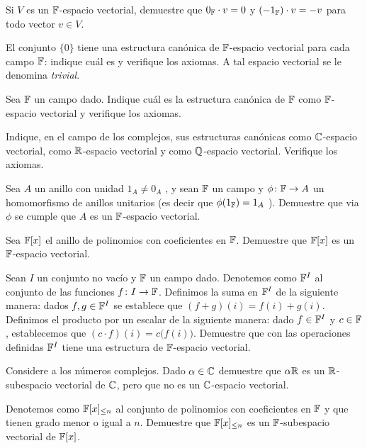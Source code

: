 \ExerciseSection


\begin{exerciselist}
  \item Si $V$ es un $\mathbb{F}$-espacio vectorial, demuestre que $0_{\mathbb{F}} \cdot v = 0$ y $(-1_{\mathbb{F}}) \cdot v = -v$ para todo vector $v \in V$.

  \item El conjunto $\{0\}$ tiene una estructura canónica de $\mathbb{F}$-espacio vectorial para cada campo $\mathbb{F}$: indique cuál es y verifique los axiomas. A tal espacio vectorial se le denomina \emph{trivial}.
  
  \item Sea $\mathbb{F}$ un campo dado. Indique cuál es la estructura canónica de $\mathbb{F}$ como $\mathbb{F}$-espacio vectorial y verifique los axiomas.
  
  \item Indique, en el campo de los complejos, sus estructuras canónicas como $\mathbb{C}$-espacio vectorial, como $\mathbb{R}$-espacio vectorial y como $\mathbb{Q}$-espacio vectorial. Verifique los axiomas.
  
  \item Sea $A$ un anillo con unidad $1_A \neq 0_A$ , y sean $\mathbb{F}$ un campo y $\phi\colon \mathbb{F} \to A$ un homomorfismo de anillos unitarios (es decir que $\phi(1_{\mathbb{F}}) = 1_A$ ). Demuestre que via $\phi$ se cumple que $A$ es un $\mathbb{F}$-espacio vectorial.
  
  \item Sea $\mathbb{F}[x]$ el anillo de polinomios con coeficientes en $\mathbb{F}$. Demuestre que $\mathbb{F}[x]$ es un $\mathbb{F}$-espacio vectorial.
  
  \item \label{exer:F^I} Sean $I$ un conjunto no vacío y $\mathbb{F}$ un campo dado. Denotemos como $\mathbb{F}^I$ al conjunto de las funciones $f\colon I \to \mathbb{F}$. Definimos la suma en $\mathbb{F}^I$ de la siguiente manera: dados $f, g \in \mathbb{F}^I$ se establece que $(f + g)(i) = f(i) + g(i)$. Definimos el producto por un escalar de la siguiente manera: dado $f \in \mathbb{F}^I$ y $c \in \mathbb{F}$, establecemos que $(c \cdot f )(i) = c \bigl( f(i) \bigr)$. Demuestre que con las operaciones definidas $\mathbb{F}^I$ tiene una estructura de $\mathbb{F}$-espacio vectorial.
  
  \item Considere a los números complejos. Dado $\alpha \in \mathbb{C}$ demuestre que $\alpha \mathbb{R}$ es un $\mathbb{R}$-subespacio vectorial de $\mathbb{C}$, pero que no es un $\mathbb{C}$-espacio vectorial.
  
  \item \label{exer:PolyGradLeqn} Denotemos como $\mathbb{F}[x]_{\leq n}$ al conjunto de polinomios con coeficientes en $\mathbb{F}$ y que tienen grado menor o igual a $n$. Demuestre que $\mathbb{F}[x]_{\leq n}$ es un $\mathbb{F}$-subespacio vectorial de $\mathbb{F}[x]$.
  

\end{exerciselist}
